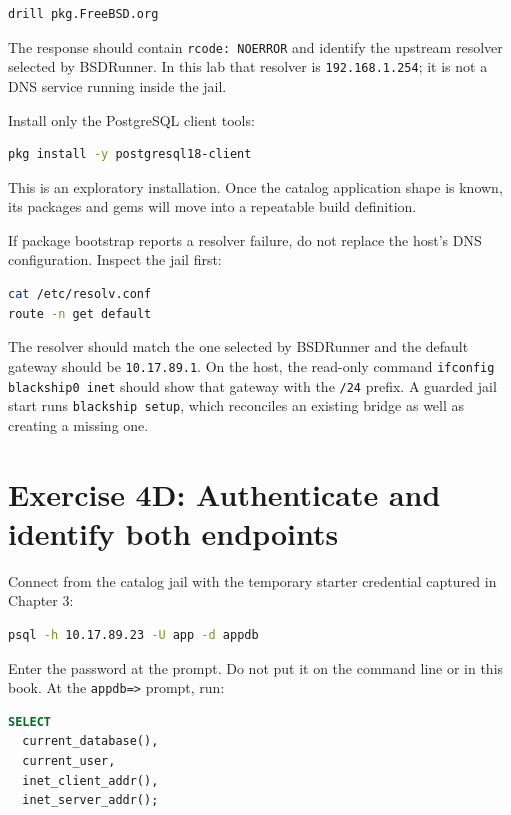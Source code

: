 \begin{lstlisting}[language=sh]
drill pkg.FreeBSD.org
\end{lstlisting}

The response should contain \texttt{rcode: NOERROR} and identify the upstream
resolver selected by BSDRunner. In this lab that resolver is
\texttt{192.168.1.254}; it is not a DNS service running inside the jail.

Install only the PostgreSQL client tools:

\begin{lstlisting}[language=sh]
pkg install -y postgresql18-client
\end{lstlisting}

This is an exploratory installation. Once the catalog application shape is
known, its packages and gems will move into a repeatable build definition.

If package bootstrap reports a resolver failure, do not replace the host's DNS
configuration. Inspect the jail first:

\begin{lstlisting}[language=sh]
cat /etc/resolv.conf
route -n get default
\end{lstlisting}

The resolver should match the one selected by BSDRunner and the default gateway
should be \texttt{10.17.89.1}. On the host, the read-only command
\texttt{ifconfig blackship0 inet} should show that gateway with the
\texttt{/24} prefix. A guarded jail start runs \texttt{blackship setup}, which
reconciles an existing bridge as well as creating a missing one.

\section{Exercise 4D: Authenticate and identify both endpoints}

Connect from the catalog jail with the temporary starter credential captured
in Chapter 3:

\begin{lstlisting}[language=sh]
psql -h 10.17.89.23 -U app -d appdb
\end{lstlisting}

Enter the password at the prompt. Do not put it on the command line or in this
book. At the \texttt{appdb=>} prompt, run:

\begin{lstlisting}[language=SQL]
SELECT
  current_database(),
  current_user,
  inet_client_addr(),
  inet_server_addr();
\end{lstlisting}

